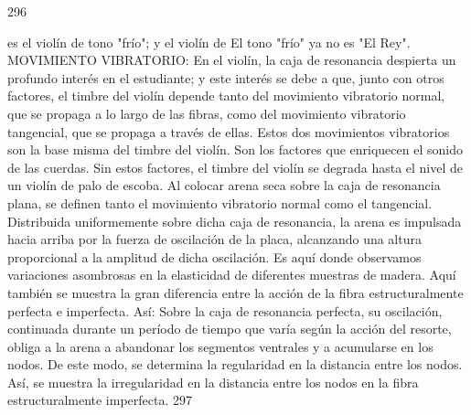 296

es el violín de tono "frío"; y el violín de
El tono "frío" ya no es "El Rey".
MOVIMIENTO VIBRATORIO: En el violín, la caja de resonancia despierta un profundo interés en el estudiante; y este interés se debe a que, junto con otros factores, el timbre del violín depende tanto del movimiento vibratorio normal, que se propaga a lo largo de las fibras, como del movimiento vibratorio tangencial, que se propaga a través de ellas. Estos dos movimientos vibratorios son la base misma del timbre del violín. Son los factores que enriquecen el sonido de las cuerdas. Sin estos factores, el timbre del violín se degrada hasta el nivel de un violín de palo de escoba. Al colocar arena seca sobre la caja de resonancia plana, se definen tanto el movimiento vibratorio normal como el tangencial. Distribuida uniformemente sobre dicha caja de resonancia, la arena es impulsada hacia arriba por la fuerza de oscilación de la placa, alcanzando una altura proporcional a la amplitud de dicha oscilación. Es aquí donde observamos variaciones asombrosas en la elasticidad de diferentes muestras de madera. Aquí también se muestra la gran diferencia entre la acción de la fibra estructuralmente perfecta e imperfecta. Así: Sobre la caja de resonancia perfecta, su oscilación, continuada durante un período de tiempo que varía según la acción del resorte, obliga a la arena a abandonar los segmentos ventrales y a acumularse en los nodos. De este modo, se determina la regularidad en la distancia entre los nodos. Así, se muestra la irregularidad en la distancia entre los nodos en la fibra estructuralmente imperfecta.
297

